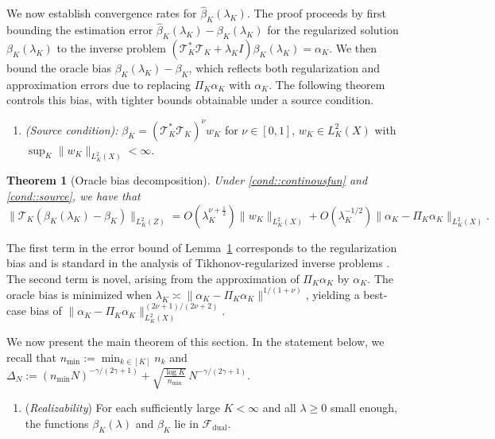 \documentclass[11pt]{article}
\theoremstyle{plain}
\newtheorem{theorem}{Theorem}
\theoremstyle{definition}
\theoremstyle{remark}
\theoremstyle{definition}
\begin{document}
We now establish convergence rates for \(\widehat{\beta}_K(\lambda_K)\). The proof proceeds by first bounding the estimation error \(\widehat{\beta}_K(\lambda_K) - \beta_K(\lambda_K)\) for the regularized solution \(\beta_K(\lambda_K)\) to the inverse problem \((\mathcal{T}_K^* \mathcal{T}_K + \lambda_K I)\beta_K(\lambda_K) = \alpha_K\). We then bound the oracle bias \(\beta_K(\lambda_K) - \beta_K\), which reflects both regularization and approximation errors due to replacing \(\Pi_K \alpha_K\) with \(\alpha_K\). The following theorem controls this bias, with tighter bounds obtainable under a source condition.   




\begin{enumerate}[label=\bf{A\arabic*)}, ref={A\arabic*}, resume=condA]
\item \textit{(Source condition):}  \(\beta_K = (\mathcal{T}_{K}^* \mathcal{T}_{K})^{ \nu} w_{K} \) for \(\nu \in [0,1]\), \(w_{K} \in L^2_K(X) \) with $\sup_K \|w_K\|_{L^2_K(X)} < \infty$. \label{cond::source}  %
\end{enumerate}


 \begin{theorem}[Oracle bias decomposition]
     \label{lemma::approxstrongident} Under \ref{cond::continousfun} and \ref{cond::source}, we have that
    \[
    \|\mathcal{T}_{K}(\beta_{K}(\lambda_K) - \beta_{K}) \|_{L^2_K(Z)} = O(\lambda_K^{\nu + \frac{1}{2}}) \|w_{K}\|_{L^2_K(X)} + O(\lambda_K^{-1/2}) \|\alpha_K - \Pi_{K} \alpha_K\|_{L^2_K(X)}.
    \] 
\end{theorem}

The first term in the error bound of Lemma~\ref{lemma::approxstrongident} corresponds to the regularization bias and is standard in the analysis of Tikhonov-regularized inverse problems \citep{bennett2023source}. The second term is novel, arising from the approximation of \(\Pi_K \alpha_K\) by \(\alpha_K\). The oracle bias is minimized when \(\lambda_K \asymp \|\alpha_K - \Pi_K \alpha_K\|^{1/(1+\nu)}\), yielding a best-case bias of \(\|\alpha_K - \Pi_K \alpha_K\|^{(2\nu + 1)/(2\nu + 2)}_{L^2_K(X)}\). 


We now present the main theorem of this section. In the statement below, we recall that \(n_{\min} := \min_{k \in [K]} n_k\) and $\Delta_N 
:= (n_{\min}N)^{-\gamma/(2\gamma+1)} 
   + \sqrt{\tfrac{\log K}{n_{\min}}}\,N^{-\gamma/(2\gamma+1)}.$


 

\begin{enumerate}[label=\bf{A\arabic*)}, ref={A\arabic*}, resume=condA]
   \item (\textit{Realizability}) \label{cond::funclasscontainsdual} 
   For each sufficiently large \(K < \infty\) and all \(\lambda \ge 0\) small enough, 
   the functions \(\beta_K(\lambda)\) and \(\beta_K\) lie in 
   \(\mathcal{F}_{\mathrm{dual}}\).
\end{enumerate}
 
\end{document}
